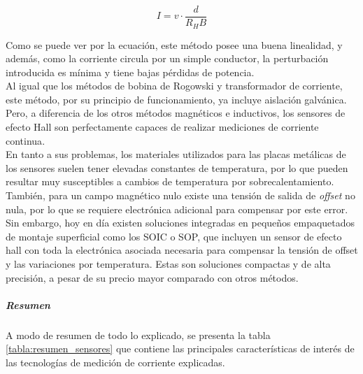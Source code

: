 \begin{equation}\label{ec_hall}
    I = v\cdot\frac{d}{R_HB}
\end{equation}

Como se puede ver por la ecuación, este método posee una {\Medium buena linealidad}, y además, como la corriente circula por un simple conductor, la perturbación introducida es mínima y tiene {\Medium bajas pérdidas de potencia}.\\

Al igual que los métodos de bobina de Rogowski y transformador de corriente, este método, por su principio de funcionamiento, ya {\Medium incluye aislación galvánica}. Pero, a diferencia de los otros métodos magnéticos e inductivos, los sensores de efecto Hall son perfectamente {\Medium capaces de realizar mediciones de corriente continua}.\\

En tanto a sus problemas, los materiales utilizados para las placas metálicas de los sensores suelen tener {\Medium elevadas constantes de temperatura}, por lo que pueden resultar muy susceptibles a cambios de temperatura por sobrecalentamiento. También, para un campo magnético nulo existe una tensión de salida de \textit{offset} no nula, por lo que se requiere electrónica adicional para compensar por este error.\\

Sin embargo, hoy en día existen soluciones integradas en pequeños empaquetados de montaje superficial como los SOIC o SOP, que incluyen un sensor de efecto hall con toda la electrónica asociada necesaria para compensar la tensión de offset y las variaciones por temperatura. Estas son soluciones compactas y de alta precisión, a pesar de su precio mayor comparado con otros métodos.\\\pagebreak

\subparagraph{Resumen}

A modo de resumen de todo lo explicado, se presenta la tabla \ref{tabla:resumen_sensores} que contiene las principales características de interés de las tecnologías de medición de corriente explicadas.\\


